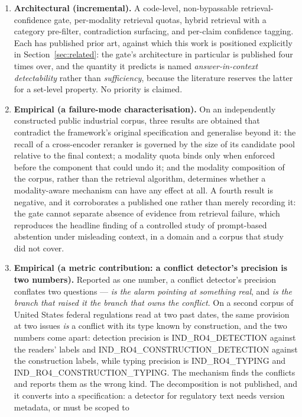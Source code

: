 \documentclass[preprint,3p,times]{elsarticle}
\begin{document}
\begin{enumerate}
\item \textbf{Architectural (incremental).} A code-level, non-bypassable
retrieval-confidence gate, per-modality retrieval quotas, hybrid retrieval with
a category pre-filter, contradiction surfacing, and per-claim confidence
tagging. Each has published prior art, against which this work is positioned
explicitly in Section~\ref{sec:related}: the gate's architecture in particular
is published four times over, and the quantity it predicts is named
\emph{answer-in-context detectability} rather than \emph{sufficiency}, because
the literature reserves the latter for a set-level property. No priority is
claimed.
\item \textbf{Empirical (a failure-mode characterisation).} On an independently
constructed public industrial corpus, three results are obtained that
contradict the framework's original specification and generalise beyond it: the
recall of a cross-encoder reranker is governed by the size of its candidate
pool relative to the final context; a modality quota binds only when enforced
before the component that could undo it; and the modality composition
of the corpus, rather than the retrieval algorithm, determines whether a
modality-aware mechanism can have any effect at all. A fourth result is
negative, and it corroborates a published one rather than merely recording it:
the gate cannot separate absence of evidence from retrieval failure, which
reproduces the headline finding of a controlled study of prompt-based
abstention under misleading context, in a domain and a corpus that study did
not cover.
\item \textbf{Empirical (a metric contribution: a conflict detector's precision
is two numbers).} Reported as one number, a conflict detector's precision
conflates two questions --- \emph{is the alarm pointing at something real},
and \emph{is the branch that raised it the branch that owns the conflict}.
On a second corpus of United States federal regulations read at two past
dates, the same provision at two issues \emph{is} a conflict with its type
known by construction, and the two numbers come apart: detection precision is
{{IND_RO4_DETECTION}} against the readers' labels and
{{IND_RO4_CONSTRUCTION_DETECTION}} against the construction labels, while
typing precision is {{IND_RO4_TYPING}} and {{IND_RO4_CONSTRUCTION_TYPING}}.
The mechanism finds the conflicts and reports them as the wrong kind. The
decomposition is not published, and it converts into a specification: a
detector for regulatory text needs version metadata, or must be scoped to

\end{enumerate}
\end{document}
